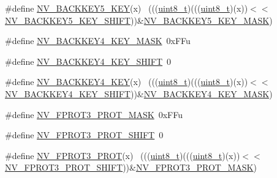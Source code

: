 \begin{DoxyCompactItemize}
\item 
\#define \hyperlink{group___n_v___register___masks_gafcbf4418e3079604800f92142c11c249}{N\+V\+\_\+\+B\+A\+C\+K\+K\+E\+Y5\+\_\+\+K\+EY}(x)                                          ~(((\hyperlink{_p_e___types_8h_aba7bc1797add20fe3efdf37ced1182c5}{uint8\+\_\+t})(((\hyperlink{_p_e___types_8h_aba7bc1797add20fe3efdf37ced1182c5}{uint8\+\_\+t})(x))$<$$<$\hyperlink{group___n_v___register___masks_ga68762e18611e6dfaed3ddfd7847c09f4}{N\+V\+\_\+\+B\+A\+C\+K\+K\+E\+Y5\+\_\+\+K\+E\+Y\+\_\+\+S\+H\+I\+FT}))\&\hyperlink{group___n_v___register___masks_gab1e58bd037f31bcaa1b96a71340315ba}{N\+V\+\_\+\+B\+A\+C\+K\+K\+E\+Y5\+\_\+\+K\+E\+Y\+\_\+\+M\+A\+SK})
\item 
\#define \hyperlink{group___n_v___register___masks_ga49a74f76cf8b7787284ac6e510e4e0c3}{N\+V\+\_\+\+B\+A\+C\+K\+K\+E\+Y4\+\_\+\+K\+E\+Y\+\_\+\+M\+A\+SK}~0x\+F\+Fu
\item 
\#define \hyperlink{group___n_v___register___masks_gadfa9b097c522673010b11e94a5a7b9eb}{N\+V\+\_\+\+B\+A\+C\+K\+K\+E\+Y4\+\_\+\+K\+E\+Y\+\_\+\+S\+H\+I\+FT}~0
\item 
\#define \hyperlink{group___n_v___register___masks_ga51340cca5ef5a77628cc40a0566f32f8}{N\+V\+\_\+\+B\+A\+C\+K\+K\+E\+Y4\+\_\+\+K\+EY}(x)                                          ~(((\hyperlink{_p_e___types_8h_aba7bc1797add20fe3efdf37ced1182c5}{uint8\+\_\+t})(((\hyperlink{_p_e___types_8h_aba7bc1797add20fe3efdf37ced1182c5}{uint8\+\_\+t})(x))$<$$<$\hyperlink{group___n_v___register___masks_gadfa9b097c522673010b11e94a5a7b9eb}{N\+V\+\_\+\+B\+A\+C\+K\+K\+E\+Y4\+\_\+\+K\+E\+Y\+\_\+\+S\+H\+I\+FT}))\&\hyperlink{group___n_v___register___masks_ga49a74f76cf8b7787284ac6e510e4e0c3}{N\+V\+\_\+\+B\+A\+C\+K\+K\+E\+Y4\+\_\+\+K\+E\+Y\+\_\+\+M\+A\+SK})
\item 
\#define \hyperlink{group___n_v___register___masks_ga1a2ecc3ba1f6ae4c2db7fcaa8f369b34}{N\+V\+\_\+\+F\+P\+R\+O\+T3\+\_\+\+P\+R\+O\+T\+\_\+\+M\+A\+SK}~0x\+F\+Fu
\item 
\#define \hyperlink{group___n_v___register___masks_gaee74e224c0572f7618f28c11d921b6e3}{N\+V\+\_\+\+F\+P\+R\+O\+T3\+\_\+\+P\+R\+O\+T\+\_\+\+S\+H\+I\+FT}~0
\item 
\#define \hyperlink{group___n_v___register___masks_ga480ba67bcc94573ed72a579f378d99a1}{N\+V\+\_\+\+F\+P\+R\+O\+T3\+\_\+\+P\+R\+OT}(x)                                            ~(((\hyperlink{_p_e___types_8h_aba7bc1797add20fe3efdf37ced1182c5}{uint8\+\_\+t})(((\hyperlink{_p_e___types_8h_aba7bc1797add20fe3efdf37ced1182c5}{uint8\+\_\+t})(x))$<$$<$\hyperlink{group___n_v___register___masks_gaee74e224c0572f7618f28c11d921b6e3}{N\+V\+\_\+\+F\+P\+R\+O\+T3\+\_\+\+P\+R\+O\+T\+\_\+\+S\+H\+I\+FT}))\&\hyperlink{group___n_v___register___masks_ga1a2ecc3ba1f6ae4c2db7fcaa8f369b34}{N\+V\+\_\+\+F\+P\+R\+O\+T3\+\_\+\+P\+R\+O\+T\+\_\+\+M\+A\+SK})
$$
\end{DoxyCompactItemize}
